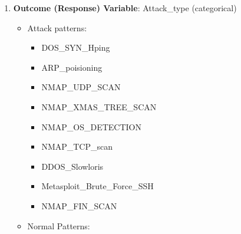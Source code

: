 \documentclass[
  letterpaper,
  DIV=11,
  numbers=noendperiod]{scrartcl}
\providecommand{\tightlist}{%
  \setlength{\itemsep}{0pt}\setlength{\parskip}{0pt}}
\begin{document}
\begin{enumerate}
  \begin{itemize}
  \tightlist
  \item
    .min --- minimum observed value within the flow.
  \item
    .max --- maximum observed value within the flow.
  \item
    .tot --- total accumulated value.
  \item
    .avg --- arithmetic mean across packets/events.
  \item
    .std --- standard deviation measuring variability.
  \item
    \_per\_sec --- rate-based metric normalized by time.
  \item
    \_flag\_count --- count of packets containing specific TCP control
    flags.
  \item
    \_bytes, \_pkts, \_payload --- volume-based measurements describing
    byte counts, packet counts, or payload sizes.
  \item
    \_iat --- inter-arrival time statistics between packets.
  \item
    \_window\_size --- TCP window characteristics reflecting
    transport-layer behavior.
  \end{itemize}

  This prefix--suffix structure enables consistent interpretation across
  the 83 features while allowing the same behavioral concept (e.g.,
  payload size or timing variability) to be analyzed across traffic
  directions and statistical summaries.
\item
  \textbf{Outcome (Response) Variable}: Attack\_type (categorical)

  \begin{itemize}
  \tightlist
  \item
    Attack patterns:

    \begin{itemize}
    \tightlist
    \item
      DOS\_SYN\_Hping
    \item
      ARP\_poisioning
    \item
      NMAP\_UDP\_SCAN
    \item
      NMAP\_XMAS\_TREE\_SCAN
    \item
      NMAP\_OS\_DETECTION
    \item
      NMAP\_TCP\_scan
    \item
      DDOS\_Slowloris
    \item
      Metasploit\_Brute\_Force\_SSH
    \item
      NMAP\_FIN\_SCAN
    \end{itemize}
  \item
    Normal Patterns:


\end{itemize}
\end{enumerate}
\end{document}
